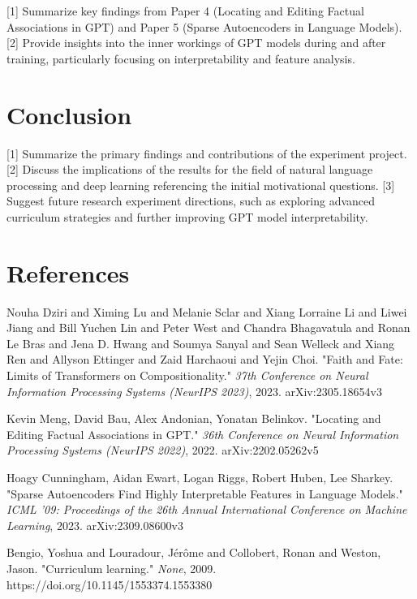 \documentclass[12pt]{article}
\theoremstyle{plain}
\theoremstyle{definition}
\theoremstyle{remark}
\begin{document}
[1] Summarize key findings from Paper 4 (Locating and Editing Factual Associations in GPT) and Paper 5 (Sparse Autoencoders in Language Models).
[2] Provide insights into the inner workings of GPT models during and after training, particularly focusing on interpretability and feature analysis.

\section{Conclusion}
\label{sec:concl}

[1] Summarize the primary findings and contributions of the experiment project.
[2] Discuss the implications of the results for the field of natural language processing and deep learning referencing the initial motivational questions.
[3] Suggest future research experiment directions, such as exploring advanced curriculum strategies and further improving GPT model interpretability.

%
%
\section{References}
\label{sec:references}
\begin{thebibliography}{9}

     Nouha Dziri and Ximing Lu and Melanie Sclar and Xiang Lorraine Li and Liwei Jiang and Bill Yuchen Lin and Peter West and Chandra Bhagavatula and Ronan Le Bras and Jena D. Hwang and Soumya Sanyal and Sean Welleck and Xiang Ren and Allyson Ettinger and Zaid Harchaoui and Yejin Choi. "{Faith and Fate: Limits of Transformers on Compositionality.}" \textit{37th Conference on Neural Information Processing Systems (NeurIPS 2023)}, 2023. arXiv:2305.18654v3

     Kevin Meng, David Bau, Alex Andonian, Yonatan Belinkov. "Locating and Editing Factual Associations in GPT." \textit{36th Conference on Neural Information Processing Systems (NeurIPS 2022)}, 2022. arXiv:2202.05262v5

     Hoagy Cunningham, Aidan Ewart, Logan Riggs, Robert Huben, Lee Sharkey. "Sparse Autoencoders Find Highly Interpretable Features in Language Models." \textit{ICML '09: Proceedings of the 26th Annual International Conference on Machine Learning}, 2023. arXiv:2309.08600v3

     Bengio, Yoshua and Louradour, J\'{e}r\^{o}me and Collobert, Ronan and Weston, Jason. "Curriculum learning." \textit{None}, 2009. https://doi.org/10.1145/1553374.1553380

\end{thebibliography}
\end{document}

